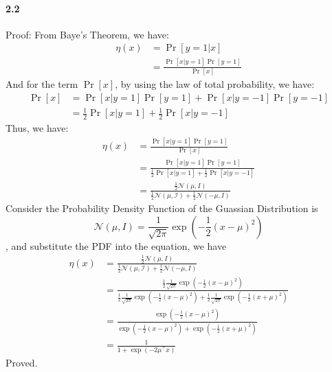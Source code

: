 \documentclass[11pt]{article}
\begin{document}
\paragraph{2.2}
Proof:
\newline
From Baye's Theorem, we have:
\begin{equation}
  \begin{split}
    \eta(x) &= \Pr[y=1|x] \\
    &= \frac{\Pr[x|y=1]\Pr[y=1]}{\Pr[x]}
  \end{split}
\end{equation}
And for the term $\Pr[x]$, by using the law of total probability, we have:
\begin{equation}
  \begin{split}
    \Pr[x] &= \Pr[x|y=1] \Pr[y=1] + \Pr[x|y=-1]\Pr[y=-1] \\
    &= \frac{1}{2} \Pr[x|y=1] + \frac{1}{2} \Pr[x|y=-1]
  \end{split}
\end{equation}
Thus, we have:
\begin{equation}
  \begin{split}
    \eta(x) &= \frac{\Pr[x|y=1]\Pr[y=1]}{\Pr[x]} \\
    &= \frac{\Pr[x|y=1]\Pr[y=1]}{\frac{1}{2}\Pr[x|y=1] + \frac{1}{2}\Pr[x|y=-1]} \\
    &= \frac{\frac{1}{2}\mathcal{N}(\mu, I)}{\frac{1}{2}\mathcal{{N}(\mu,I)}  + \frac{1}{2}\mathcal{N}(-\mu, I)}
  \end{split}
\end{equation}
Consider the Probability Density Function of the Guassian Distribution is
\begin{equation}
  \mathcal{N}(\mu, I) = \frac{1}{\sqrt{2\pi}}\exp(-\frac{1}{2}(x-\mu)^2)
\end{equation}
, and substitute the PDF into the equation, we have
\begin{equation}
  \begin{split}
    \eta(x) &= \frac{\frac{1}{2}\mathcal{N}(\mu, I)}{\frac{1}{2}\mathcal{{N}(\mu,I)}  + \frac{1}{2}\mathcal{N}(-\mu, I)} \\
    &= \frac{\frac{1}{2}\frac{1}{\sqrt{2\pi}}\exp(-\frac{1}{2}(x-\mu)^2)}{\frac{1}{2}\frac{1}{\sqrt{2\pi}}\exp(-\frac{1}{2}(x-\mu)^2)  + \frac{1}{2}\frac{1}{\sqrt{2\pi}}\exp(-\frac{1}{2}(x+\mu)^2)} \\
    &= \frac{\exp(-\frac{1}{2}(x-\mu)^2)}{\exp(-\frac{1}{2}(x-\mu)^2)  + \exp(-\frac{1}{2}(x+\mu)^2)} \\
    &= \frac{1}{1 + \exp(-2\mu^\top x)}
  \end{split}
\end{equation}
Proved.
\end{document}
